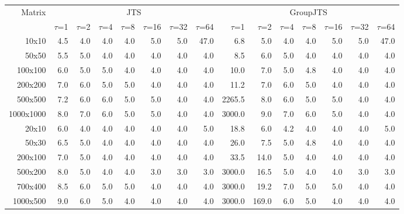 \begin{tabular}{rrrrrrrrrrrrrrr}
\toprule
Matrix & \multicolumn{7}{c}{JTS} & \multicolumn{7}{c}{GroupJTS} \\
\cmidrule(lr){2-8} \cmidrule(lr){9-15}
& $\tau$=1 & $\tau$=2 & $\tau$=4 & $\tau$=8 & $\tau$=16 & $\tau$=32 & $\tau$=64 & $\tau$=1 & $\tau$=2 & $\tau$=4 & $\tau$=8 & $\tau$=16 & $\tau$=32 & $\tau$=64 \\
\midrule
10x10 & 4.5 & 4.0 & 4.0 & 4.0 & 5.0 & 5.0 & 47.0 & 6.8 & 5.0 & 4.0 & 4.0 & 5.0 & 5.0 & 47.0 \\
50x50 & 5.5 & 5.0 & 4.0 & 4.0 & 4.0 & 4.0 & 4.0 & 8.5 & 6.0 & 5.0 & 4.0 & 4.0 & 4.0 & 4.0 \\
100x100 & 6.0 & 5.0 & 5.0 & 4.0 & 4.0 & 4.0 & 4.0 & 10.0 & 7.0 & 5.0 & 4.8 & 4.0 & 4.0 & 4.0 \\
200x200 & 7.0 & 6.0 & 5.0 & 5.0 & 4.0 & 4.0 & 4.0 & 11.2 & 7.0 & 6.0 & 5.0 & 4.0 & 4.0 & 4.0 \\
500x500 & 7.2 & 6.0 & 6.0 & 5.0 & 5.0 & 4.0 & 4.0 & 2265.5 & 8.0 & 6.0 & 5.0 & 5.0 & 4.0 & 4.0 \\
1000x1000 & 8.0 & 7.0 & 6.0 & 5.0 & 5.0 & 4.0 & 4.0 & 3000.0 & 9.0 & 7.0 & 6.0 & 5.0 & 4.0 & 4.0 \\
\midrule
20x10 & 6.0 & 4.0 & 4.0 & 4.0 & 4.0 & 4.0 & 5.0 & 18.8 & 6.0 & 4.2 & 4.0 & 4.0 & 4.0 & 5.0 \\
50x30 & 6.5 & 5.0 & 4.0 & 4.0 & 4.0 & 4.0 & 4.0 & 26.0 & 7.5 & 5.0 & 4.8 & 4.0 & 4.0 & 4.0 \\
200x100 & 7.0 & 5.0 & 4.0 & 4.0 & 4.0 & 4.0 & 4.0 & 33.5 & 14.0 & 5.0 & 4.0 & 4.0 & 4.0 & 4.0 \\
500x200 & 8.0 & 5.0 & 4.0 & 4.0 & 3.0 & 3.0 & 3.0 & 3000.0 & 16.5 & 5.0 & 4.0 & 4.0 & 3.0 & 3.0 \\
700x400 & 8.5 & 6.0 & 5.0 & 5.0 & 4.0 & 4.0 & 4.0 & 3000.0 & 19.2 & 7.0 & 5.0 & 5.0 & 4.0 & 4.0 \\
1000x500 & 9.0 & 6.0 & 5.0 & 4.0 & 4.0 & 4.0 & 4.0 & 3000.0 & 169.0 & 6.0 & 5.0 & 4.0 & 4.0 & 4.0 \\
\bottomrule
\end{tabular}
